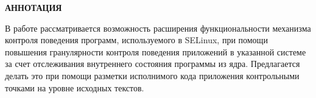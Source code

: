 \documentclass[russian,utf8,pointsubsection,emptystyle, 12pt]{eskdtext}
\begin{document}
\maketitle


\large{\textbf{АННОТАЦИЯ}}

В работе рассматривается возможность расширения функциональности
механизма контроля поведения программ, используемого в SELinux, при 
помощи повышения гранулярности контроля поведения приложений
в указанной системе за счет отслеживания внутреннего состояния
программы из ядра. Предлагается делать это при помощи
разметки исполнимого кода приложения контрольными точками 
на уровне исходных текстов. 

\newpage

\tableofcontents
\newpage

%




%

\end{document}
